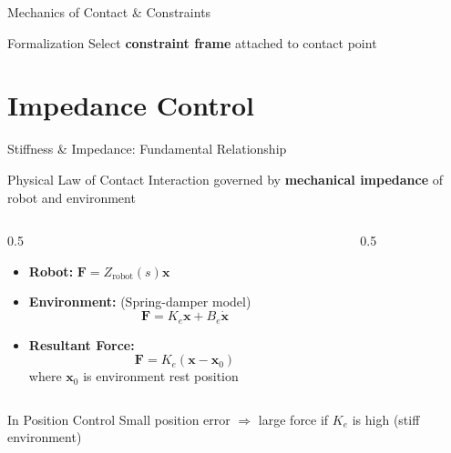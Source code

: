 \documentclass[10pt]{beamer}
\newcommand{\vect}[1]{\boldsymbol{#1}}
\newcommand{\x}{\vect{x}}
\newcommand{\F}{\vect{F}}
\begin{document}
\begin{frame}{Mechanics of Contact \& Constraints}
    \begin{block}{Formalization}
        Select \textbf{constraint frame} attached to contact point
    \end{block}
\end{frame}

\section{Impedance Control}
\begin{frame}{Stiffness \& Impedance: Fundamental Relationship}
    \begin{block}{Physical Law of Contact}
        Interaction governed by \textbf{mechanical impedance} of robot and environment
    \end{block}
    
    \begin{columns}
        \begin{column}{0.5\textwidth}
            \begin{itemize}
                \item \textbf{Robot:} $\F = Z_{\text{robot}}(s)\x$
                \item \textbf{Environment:} (Spring-damper model)
                \[
                \F = K_e\x + B_e\dot{\x}
                \]
                \item \textbf{Resultant Force:}
                \[
                \F = K_e(\x - \x_0)
                \]
                where $\x_0$ is environment rest position
            \end{itemize}
        \end{column}
        
        \begin{column}{0.5\textwidth}
            \begin{center}
            \end{center}
        \end{column}
    \end{columns}
    
    \begin{alertblock}{In Position Control}
        Small position error $\Rightarrow$ large force if $K_e$ is high (stiff environment)
    \end{alertblock}
\end{frame}
\end{document}
